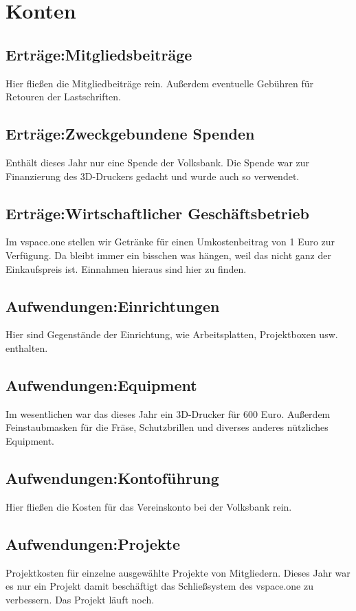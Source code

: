 \documentclass[12pt,a4paper]{article}
\begin{document}
\section{Konten}
\subsection{Erträge:Mitgliedsbeiträge}
Hier fließen die Mitgliedbeiträge rein. Außerdem eventuelle Gebühren für Retouren der Lastschriften.

\subsection{Erträge:Zweckgebundene Spenden}
Enthält dieses Jahr nur eine Spende der Volksbank. Die Spende war zur Finanzierung des 3D-Druckers gedacht und wurde auch so verwendet.

\subsection{Erträge:Wirtschaftlicher Geschäftsbetrieb}
Im vspace.one stellen wir Getränke für einen Umkostenbeitrag von 1 Euro zur Verfügung. Da bleibt immer ein bisschen was hängen, weil das nicht ganz der Einkaufspreis ist. Einnahmen hieraus sind hier zu finden.

\subsection{Aufwendungen:Einrichtungen}
Hier sind Gegenstände der Einrichtung, wie Arbeitsplatten, Projektboxen usw. enthalten.

\subsection{Aufwendungen:Equipment}
Im wesentlichen war das dieses Jahr ein 3D-Drucker für 600 Euro. Außerdem Feinstaubmasken für die Fräse, Schutzbrillen und diverses anderes nützliches Equipment.

\subsection{Aufwendungen:Kontoführung}
Hier fließen die Kosten für das Vereinskonto bei der Volksbank rein.

\subsection{Aufwendungen:Projekte}
Projektkosten für einzelne ausgewählte Projekte von Mitgliedern. Dieses Jahr war es nur ein Projekt damit beschäftigt das Schließsystem des vspace.one zu verbessern. Das Projekt läuft noch.
\end{document}
